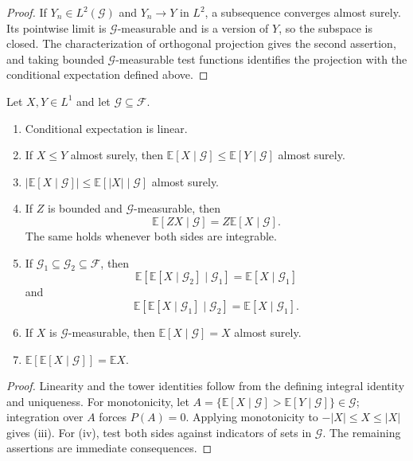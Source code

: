 \begin{proof}
If $Y_n\in L^2(\mathcal G)$ and $Y_n\to Y$ in $L^2$, a subsequence converges
almost surely. Its pointwise limit is $\mathcal G$-measurable and is a version
of $Y$, so the subspace is closed. The characterization of orthogonal
projection gives the second assertion, and taking bounded
$\mathcal G$-measurable test functions identifies the projection with the
conditional expectation defined above.
\end{proof}

\begin{thm}
Let $X,Y\in L^1$ and let $\mathcal G\subseteq\mathcal F$.
\begin{enumerate}[label=(\roman*)]
  \item Conditional expectation is linear.
  \item If $X\leq Y$ almost surely, then
  $\mathbb E[X\mid\mathcal G]\leq\mathbb E[Y\mid\mathcal G]$ almost surely.
  \item
  $|\mathbb E[X\mid\mathcal G]|
   \leq\mathbb E[|X|\mid\mathcal G]$ almost surely.
  \item If $Z$ is bounded and $\mathcal G$-measurable, then
  \[
  \mathbb E[ZX\mid\mathcal G]
   =Z\mathbb E[X\mid\mathcal G].
  \]
  The same holds whenever both sides are integrable.
  \item If $\mathcal G_1\subseteq\mathcal G_2\subseteq\mathcal F$, then
  \[
  \mathbb E[\mathbb E[X\mid\mathcal G_2]\mid\mathcal G_1]
   =\mathbb E[X\mid\mathcal G_1]
  \]
  and
  \[
  \mathbb E[\mathbb E[X\mid\mathcal G_1]\mid\mathcal G_2]
   =\mathbb E[X\mid\mathcal G_1].
  \]
  \item If $X$ is $\mathcal G$-measurable, then
  $\mathbb E[X\mid\mathcal G]=X$ almost surely.
  \item $\mathbb E[\mathbb E[X\mid\mathcal G]]=\mathbb E X$.
\end{enumerate}
\end{thm}

\begin{proof}
Linearity and the tower identities follow from the defining integral
identity and uniqueness. For monotonicity, let
$A=\{\mathbb E[X\mid\mathcal G]>
      \mathbb E[Y\mid\mathcal G]\}\in\mathcal G$; integration over $A$
forces $P(A)=0$. Applying monotonicity to $-\lvert X\rvert\leq X\leq
\lvert X\rvert$ gives (iii). For (iv), test both sides against indicators of
sets in $\mathcal G$. The remaining assertions are immediate consequences.
\end{proof}

